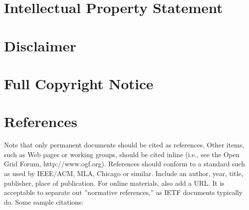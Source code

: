 \documentclass[10pt,a4paper,british]{article}
\begin{document}
\section{Intellectual Property Statement}


\section{Disclaimer}


\section{Full Copyright Notice}


\section{References}

Note that only permanent documents should be cited as
references. Other items, such as Web pages or working groups, should
be cited inline (i.e., see the Open Grid Forum,
http://www.ogf.org). References should conform to a standard such as
used by IEEE/ACM, MLA, Chicago or similar. Include an author, year,
title, publisher, place of publication. For online materials, also add
a URL. It is acceptable to separate out ''normative references,'' as
IETF documents typically do. Some sample citations:
\end{document}
